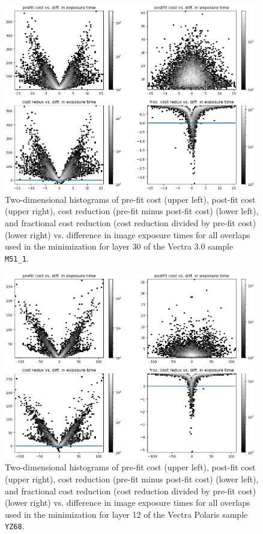 \documentclass[letterpaper,11pt]{article}
\begin{document}
\begin{figure}[!ht]
\centering
\includegraphics[width=0.98\textwidth]{images/methods/cost_reduction_plots_2d_M51_1_layer_30}
\caption{\footnotesize Two-dimensional histograms of pre-fit cost (upper left), post-fit cost (upper right), cost reduction (pre-fit minus post-fit cost) (lower left), and fractional cost reduction (cost reduction divided by pre-fit cost) (lower right) vs. difference in image exposure times for all overlaps used in the minimization for layer 30 of the Vectra 3.0 sample \texttt{M51\_1}.}
\label{fig:cost_reduction_plots_M51_1_layer_30}
\end{figure}

\begin{figure}[!ht]
\centering
\includegraphics[width=0.98\textwidth]{images/methods/cost_reduction_plots_2d_YZ68_layer_12}
\caption{\footnotesize Two-dimensional histograms of pre-fit cost (upper left), post-fit cost (upper right), cost reduction (pre-fit minus post-fit cost) (lower left), and fractional cost reduction (cost reduction divided by pre-fit cost) (lower right) vs. difference in image exposure times for all overlaps used in the minimization for layer 12 of the Vectra Polaris sample \texttt{YZ68}.}
\label{fig:cost_reduction_plots_YZ68_layer_12}
\end{figure}
\end{document}

